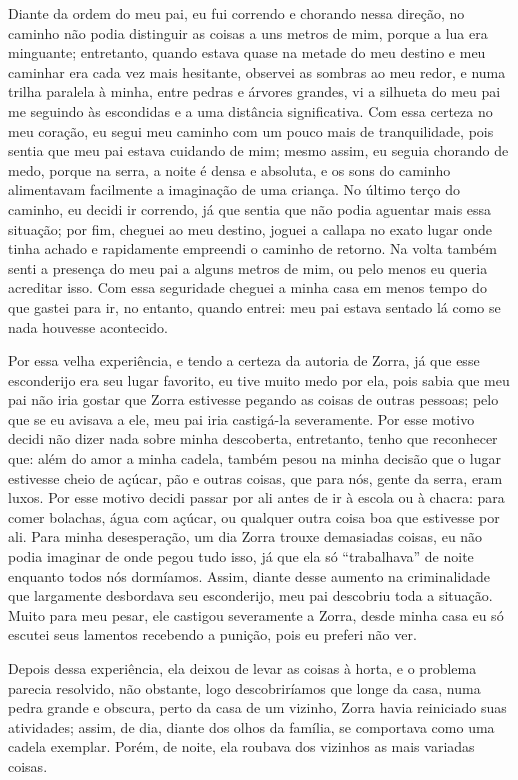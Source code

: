 Diante da ordem do meu pai, eu fui correndo e chorando nessa direção, no caminho não podia distinguir as coisas a uns metros de mim, porque a lua era minguante; entretanto, quando estava quase na metade do meu destino e meu caminhar era cada vez mais hesitante, observei as sombras ao meu redor, e numa trilha paralela à minha, entre pedras e árvores grandes, vi a silhueta do meu pai me seguindo às escondidas e a uma distância significativa.
Com essa certeza no meu coração, eu segui meu caminho com um pouco mais de tranquilidade, pois sentia que meu pai estava cuidando de mim; mesmo assim, eu seguia chorando de medo, porque na serra, a noite é densa e absoluta, e os sons do caminho alimentavam facilmente a imaginação de uma criança.
No último terço do caminho, eu decidi ir correndo, já que sentia que não podia aguentar mais essa situação; por fim, cheguei ao meu destino, joguei a callapa no exato lugar onde tinha achado e rapidamente empreendi o caminho de retorno.
Na volta também senti a presença do meu pai a alguns metros de mim, ou pelo menos eu queria acreditar isso. Com essa seguridade cheguei a minha casa em menos tempo do que gastei para ir, no entanto, quando entrei: meu pai estava sentado lá como se nada houvesse acontecido.


Por essa velha experiência, e tendo a certeza da autoria de Zorra, já que esse esconderijo era seu lugar favorito, eu tive muito medo por ela, pois sabia que meu pai não iria gostar que Zorra estivesse pegando as coisas de outras pessoas; pelo que se eu avisava a ele, meu pai iria castigá-la severamente. Por esse motivo decidi não dizer nada sobre minha descoberta, entretanto, tenho que reconhecer que: além do amor a minha cadela, também pesou na minha decisão que o lugar estivesse cheio de açúcar, pão e outras coisas, que para nós, gente da serra, eram luxos. 
Por esse motivo decidi passar por ali antes de ir à escola ou à chacra: para comer bolachas, água com açúcar, ou qualquer outra coisa boa que estivesse por ali. 
Para minha desesperação, um dia Zorra trouxe demasiadas coisas, eu  não podia imaginar de onde pegou tudo isso, já que ela só ``trabalhava'' de noite enquanto todos nós dormíamos. Assim, diante desse aumento na criminalidade que largamente desbordava seu esconderijo, meu pai descobriu toda a situação.
Muito para meu pesar, ele castigou severamente a Zorra, desde minha casa eu só escutei seus lamentos recebendo a punição, pois eu preferi não ver.


Depois dessa experiência, ela deixou de levar as coisas à horta, e o problema parecia resolvido, não obstante, logo descobriríamos que longe da casa, numa pedra grande e obscura, perto da casa de um vizinho, 
Zorra havia reiniciado suas atividades; assim, de dia, diante dos olhos da família, se comportava como uma cadela exemplar. Porém, de noite, ela roubava dos vizinhos as mais variadas coisas.

